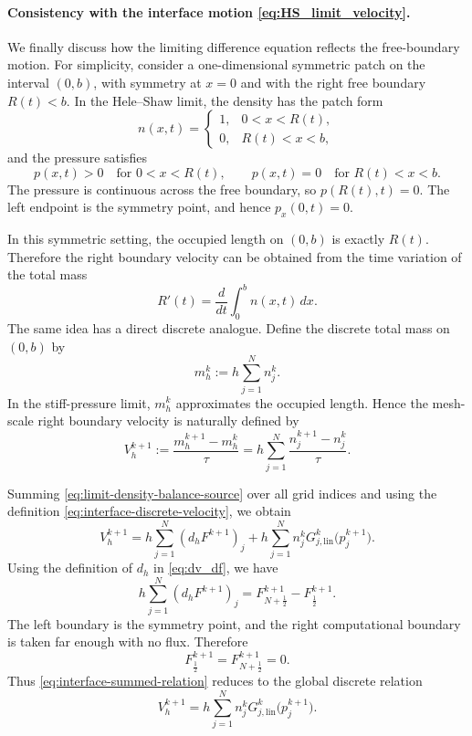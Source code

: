 \documentclass[11pt]{article}
\theoremstyle{plain}
\numberwithin{equation}{section}
\begin{document}
\paragraph{Consistency with the interface motion \eqref{eq:HS_limit_velocity}.}
We finally discuss how the limiting difference equation reflects the
free-boundary motion.  For simplicity, consider a one-dimensional
symmetric patch on the interval \((0,b)\), with symmetry at \(x=0\) and with
the right free boundary \(R(t)<b\). In the Hele--Shaw limit, the density has
the patch form
\begin{equation}
n(x,t)=
\begin{cases}
1, & 0<x<R(t),\\
0, & R(t)<x<b,
\end{cases}
\label{eq:interface-patch-density}
\end{equation}
and the pressure satisfies
\[
p(x,t)>0 \quad \text{for } 0<x<R(t),
\qquad
p(x,t)=0 \quad \text{for } R(t)<x<b .
\]
The pressure is continuous across the free boundary, so \(p(R(t),t)=0\). The
left endpoint is the symmetry point, and hence \(p_x(0,t)=0\).

In this symmetric setting, the occupied length on \((0,b)\) is exactly
\(R(t)\). Therefore the right boundary velocity can be obtained from the time
variation of the total mass
\[
R'(t)
=
\frac{d}{dt}\int_0^b n(x,t)\,dx .
\]
The same idea has a direct discrete analogue. Define the discrete total
mass on \((0,b)\) by
\[
m_h^k:=h\sum_{j=1}^{N}n_j^k .
\]
In the stiff-pressure limit, \(m_h^k\) approximates the occupied length.
Hence the mesh-scale right boundary velocity is naturally defined by
\begin{equation}
V_h^{k+1}
:=
\frac{m_h^{k+1}-m_h^k}{\tau}
=
h\sum_{j=1}^{N}\frac{n_j^{k+1}-n_j^k}{\tau}.
\label{eq:interface-discrete-velocity}
\end{equation}



Summing \eqref{eq:limit-density-balance-source} over all grid indices and
using the definition \eqref{eq:interface-discrete-velocity}, we obtain
\begin{equation}
V_h^{k+1}
=
h\sum_{j=1}^{N}(d_hF^{k+1})_j
+
h\sum_{j=1}^{N}
n_j^kG_{j,\mathrm{lin}}^k\bigl(p_j^{k+1}\bigr).
\label{eq:interface-summed-relation}
\end{equation}
Using the definition of \(d_h\) in \eqref{eq:dv_df}, we have
\[
h\sum_{j=1}^{N}(d_hF^{k+1})_j
=
F_{N+\frac{1}{2}}^{k+1}
-
F_{\frac{1}{2}}^{k+1}.
\]
The left boundary is the symmetry point, and the right computational boundary
is taken far enough with no flux. Therefore
\[
F_{\frac{1}{2}}^{k+1}
=
F_{N+\frac{1}{2}}^{k+1}
=
0.
\]
Thus \eqref{eq:interface-summed-relation} reduces to the global discrete
relation
\begin{equation}
V_h^{k+1}
=
h\sum_{j=1}^{N}
n_j^kG_{j,\mathrm{lin}}^k\bigl(p_j^{k+1}\bigr).
\label{eq:interface-global-relation}
\end{equation}
\end{document}
